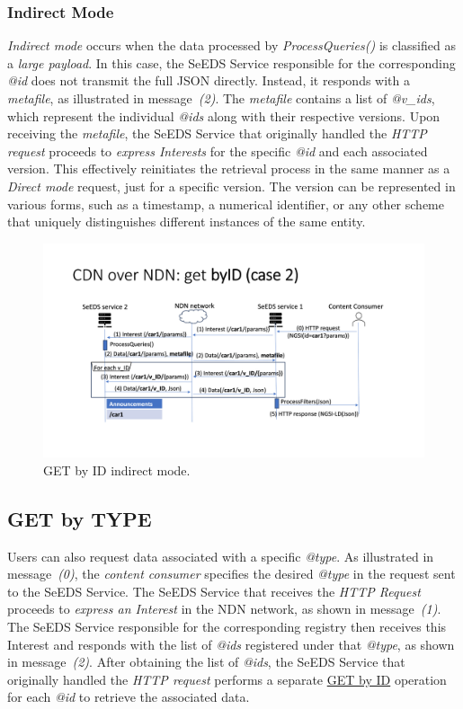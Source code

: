 \documentclass{article}
\begin{document}
\subsubsection{Indirect Mode}

\emph{Indirect mode} occurs when the data processed by \textit{ProcessQueries()} is classified as a \emph{large payload}. In this case, the SeEDS Service responsible for the corresponding \textit{@id} does not transmit the full JSON directly. Instead, it responds with a \emph{metafile}, as illustrated in message~\emph{(2)}. The \emph{metafile} contains a list of \textit{@v\_ids}, which represent the individual \textit{@ids} along with their respective versions. Upon receiving the \emph{metafile}, the SeEDS Service that originally handled the \emph{HTTP request} proceeds to \emph{express Interests} for the specific \textit{@id} and each associated version. This effectively reinitiates the retrieval process in the same manner as a \emph{Direct mode} request, just for a specific version. The version can be represented in various forms, such as a timestamp, a numerical identifier, or any other scheme that uniquely distinguishes different instances of the same entity.


\begin{figure}[H]
    \centering
    \includegraphics[width=0.8\linewidth]{images/get_by_id_indirect.png}
    \caption{GET by ID indirect mode.}
    \label{fig:get_by_id_indirect}
\end{figure}

\pagebreak 

\subsection{GET by TYPE}\label{get_by_type_section}

Users can also request data associated with a specific \textit{@type}. As illustrated in message~\emph{(0)}, the \emph{content consumer} specifies the desired \textit{@type} in the request sent to the SeEDS Service. The SeEDS Service that receives the \emph{HTTP Request} proceeds to \emph{express an Interest} in the NDN network, as shown in message~\emph{(1)}. The SeEDS Service responsible for the corresponding registry then receives this Interest and responds with the list of \textit{@ids} registered under that \textit{@type}, as shown in message~\emph{(2)}. After obtaining the list of \textit{@ids}, the SeEDS Service that originally handled the \emph{HTTP request} performs a separate \hyperref[get_by_id_section]{GET by ID} operation for each \textit{@id} to retrieve the associated data.
\end{document}
